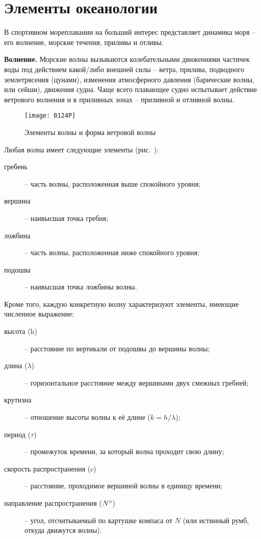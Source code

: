 \clearpage

\clearpage

\section{Элементы океанологии}

В спортивном мореплавании на больший интерес представляет динамика
моря \--- его волнение, морские течения, приливы и отливы.

\textbf{Волнение.} Морские волны вызываются
колебательными движениями частичек воды под действием какой\-/либо
внешней силы \--- ветра, прилива, подводного землетрясения (цунами),
изменения атмосферного давления (барические волны,
или сейши), движения судна. Чаще всего плавающее судно
испытывает действие ветрового волнения и в приливных зонах \---
приливной и отливной волны.

\begin{figure}[!htb]
  \centering{}
  \texttt{[image: 0124P]}
  \caption{Элементы волны и форма ветровой волны}
  \label{fig:124}
\end{figure}

Любая волна имеет следующие элементы (рис.~):
\begin{description}
\item[гребень] \--- часть волны, расположенная выше спокойного уровня;
\item[вершина] \--- наивысшая точка гребня;
\item[ложбина] \--- часть волны, расположенная ниже спокойного уровня;
\item[подошва] \--- наивысшая точка ложбины волны.
\end{description}

Кроме того, каждую конкретную волну характеризуют элементы, имеющие
численное выражение:
\begin{description}
\item[высота (h)] \--- расстояние по вертикали от подошвы до вершины
  волны;
\item[длина ($\lambda$)] \--- горизонтальное расстояние между
  вершинами двух смежных гребней;
\item[крутизна] \--- отношение высоты волны к её длине
  ($k = h / \lambda$);
\item[период ($\tau$)] \--- промежуток времени, за который волна
  проходит свою длину;
\item[скорость распространения ($c$)] \--- расстояние, проходимое
  вершиной волны в единицу времени;
\item[направление распространения ($N^\circ$)] \--- угол, отсчитываемый
  по картушке компаса от $N$ (или истинный румб, откуда движутся
  волны).
\end{description}

